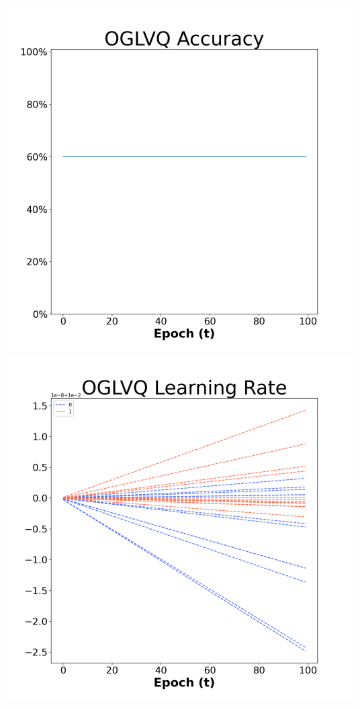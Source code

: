 \begin{figure}[H]
    \centering %
\begin{subfigure}{0.3\textwidth}
  \includegraphics[width=\linewidth]{images/exper1/NSP/OGLVQ_0.01_acc.png}
    \includegraphics[width=\linewidth]{images/exper1/NSP/OGLVQ_0.01_lr.png}

\end{subfigure}
\end{figure}
